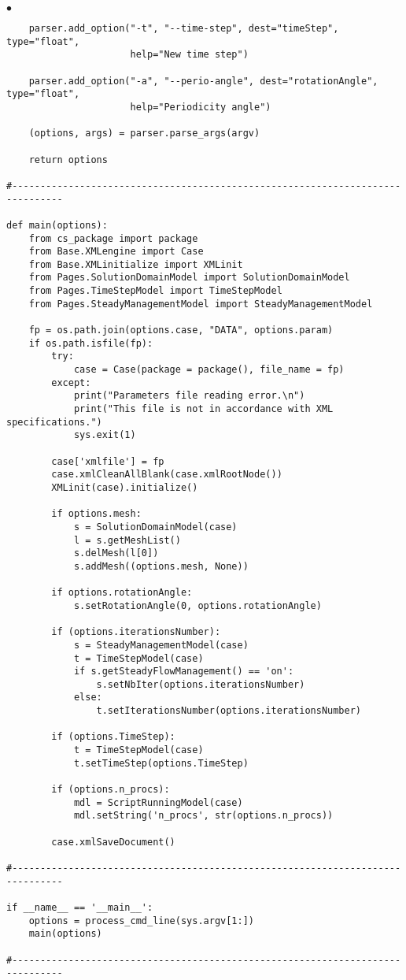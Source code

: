 \documentclass[a4paper,10pt,twoside]{csshortdoc}
\begin{document}
\begin{list}{$\bullet$}{}
\begin{verbatim}
    parser.add_option("-t", "--time-step", dest="timeStep", type="float",
                      help="New time step")

    parser.add_option("-a", "--perio-angle", dest="rotationAngle", type="float",
                      help="Periodicity angle")

    (options, args) = parser.parse_args(argv)

    return options

#-------------------------------------------------------------------------------

def main(options):
    from cs_package import package
    from Base.XMLengine import Case
    from Base.XMLinitialize import XMLinit
    from Pages.SolutionDomainModel import SolutionDomainModel
    from Pages.TimeStepModel import TimeStepModel
    from Pages.SteadyManagementModel import SteadyManagementModel

    fp = os.path.join(options.case, "DATA", options.param)
    if os.path.isfile(fp):
        try:
            case = Case(package = package(), file_name = fp)
        except:
            print("Parameters file reading error.\n")
            print("This file is not in accordance with XML specifications.")
            sys.exit(1)

        case['xmlfile'] = fp
        case.xmlCleanAllBlank(case.xmlRootNode())
        XMLinit(case).initialize()

        if options.mesh:
            s = SolutionDomainModel(case)
            l = s.getMeshList()
            s.delMesh(l[0])
            s.addMesh((options.mesh, None))

        if options.rotationAngle:
            s.setRotationAngle(0, options.rotationAngle)

        if (options.iterationsNumber):
            s = SteadyManagementModel(case)
            t = TimeStepModel(case)
            if s.getSteadyFlowManagement() == 'on':
                s.setNbIter(options.iterationsNumber)
            else:
                t.setIterationsNumber(options.iterationsNumber)

        if (options.TimeStep):
            t = TimeStepModel(case)
            t.setTimeStep(options.TimeStep)

        if (options.n_procs):
            mdl = ScriptRunningModel(case)
            mdl.setString('n_procs', str(options.n_procs))

        case.xmlSaveDocument()

#-------------------------------------------------------------------------------

if __name__ == '__main__':
    options = process_cmd_line(sys.argv[1:])
    main(options)

#-------------------------------------------------------------------------------
\end{verbatim}
\normalsize

\end{list}


%
\end{document}
